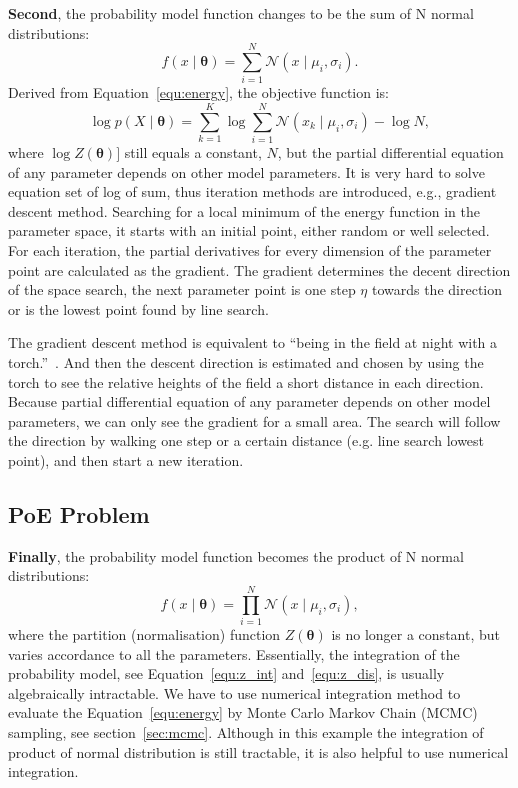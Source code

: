 \documentclass[11pt,twoside,a4paper]{article}
\begin{document}
	\textbf{Second}, the probability model function changes to be the sum of N normal distributions: 
	\begin{equation}
	f(x \mid \mathbf{\theta} ) = \sum_{i=1}^N\mathcal{N}(x \mid \mu_i, \sigma_i ).
	\end{equation}
	Derived from Equation~\ref{equ:energy}, the objective function is:
	\begin{equation}
	\log p(X \mid \mathbf{\theta} ) = \sum_{k=1}^K \log \sum_{i=1}^N \mathcal{N}(x_k \mid \mu_i, \sigma_i ) - \log N,
	\end{equation}
	where $\log Z( \mathbf{\theta})]$ still equals a constant, $ N $, but the partial differential equation of any parameter depends on other model parameters.
	It is very hard to solve equation set of log of sum, thus iteration methods are introduced, e.g., gradient descent method. %
	Searching for a local minimum of the energy function in the parameter space, it starts with an initial point, either random or well selected.
	For each iteration, the partial derivatives for every dimension of the parameter point are calculated as the gradient.
	The gradient determines the decent direction of the space search, the next parameter point is one step $ \eta $  towards the direction or is the lowest point found by line search.
	
	The gradient descent method is equivalent to ``being in the field at night with a torch.''~\cite{woodfordnotes}.
	And then the descent direction is estimated and chosen by using the torch to see the relative heights of the field a short distance in each direction.
	Because partial differential equation of any parameter depends on other model parameters, we can only see the gradient for a small area.
	The search will follow the direction by walking one step or a certain distance (e.g. line search lowest point), and then start a new iteration.
	

\subsection{PoE Problem}
	\textbf{Finally}, the probability model function becomes the product of N normal distributions: 
	\begin{equation}
	f(x \mid \mathbf{\theta} ) = \prod_{i=1}^N\mathcal{N}(x \mid \mu_i, \sigma_i ),
	\end{equation}
	where the partition (normalisation) function $Z( \mathbf{\theta})$ is no longer a constant, but varies accordance to all the parameters.
	Essentially, the integration of the probability model, see Equation~\ref{equ:z_int} and~\ref{equ:z_dis}, is usually algebraically intractable.
	We have to use numerical integration method to evaluate the Equation~\ref{equ:energy} by Monte Carlo Markov Chain (MCMC) sampling, see section~\ref{sec:mcmc}.
	Although in this example the integration of product of normal distribution is still tractable, it is also helpful to use numerical integration.
	
\end{document}
